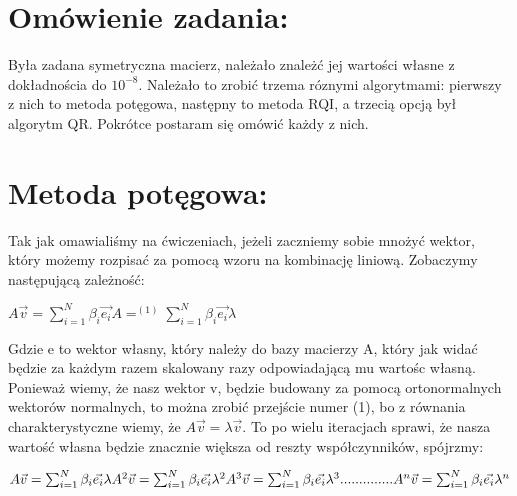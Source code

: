 \documentclass[12pt]{article}
\begin{document}
\section{Omówienie zadania:}
Była zadana symetryczna macierz, należało znależć jej wartości własne z dokładnościa do ${10^{-8}}$. Należało to zrobić trzema róznymi algorytmami: pierwszy z nich to metoda potęgowa, następny to metoda RQI, a trzecią opcją był algorytm QR. Pokrótce postaram się omówić każdy z nich.
\section{Metoda potęgowa:}
Tak jak omawialiśmy na ćwiczeniach, jeżeli zaczniemy sobie mnożyć wektor, który możemy rozpisać za pomocą wzoru na kombinację liniową. Zobaczymy następującą zależność:
\begin{center}
\begin{math}
    A\vec{v} = \sum_{i=1}^{N}\beta_{i}\vec{e_{i}}A =^{(1)} \sum_{i=1}^{N}\beta_{i}\vec{e_{i}}\lambda
\end{math}
\end{center}
Gdzie e to wektor własny, który należy do bazy macierzy A, który jak widać będzie za każdym razem skalowany razy odpowiadającą mu wartośc własną. Ponieważ wiemy, że nasz wektor v, będzie budowany za pomocą ortonormalnych wektorów normalnych, to można zrobić przejście numer (1), bo z równania charakterystyczne wiemy, że $A\vec{v} =\lambda \vec{v}$. To po wielu iteracjach sprawi, że nasza wartość własna będzie znacznie większa od reszty współczynników, spójrzmy:
\begin{center}
    \begin{math}
        A\vec{v} = \sum_{i=1}^{N}\beta_{i}\vec{e_{i}}\lambda \newline
        A^{2}\vec{v} = \sum_{i=1}^{N}\beta_{i}\vec{e_{i}}\lambda^{2} \newline
        A^{3}\vec{v} = \sum_{i=1}^{N}\beta_{i}\vec{e_{i}}\lambda^{3} \newline
        ..............\newline
        A^{n}\vec{v} = \sum_{i=1}^{N}\beta_{i}\vec{e_{i}}\lambda^{n} \newline
    \end{math}
\end{center}
\end{document}
